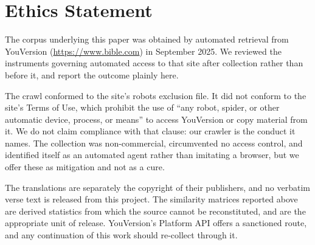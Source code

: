 \section{Ethics Statement}\label{sec:ethics_stmt}

The corpus underlying this paper was obtained by automated retrieval from
YouVersion (\url{https://www.bible.com}) in September 2025. We reviewed the
instruments governing automated access to that site after collection rather than
before it, and report the outcome plainly here.

The crawl conformed to the site's robots exclusion file. It did not conform to
the site's Terms of Use, which prohibit the use of ``any robot, spider, or other
automatic device, process, or means'' to access YouVersion or copy material from
it. We do not claim compliance with that clause: our crawler is the conduct it
names. The collection was non-commercial, circumvented no access control, and
identified itself as an automated agent rather than imitating a browser, but we
offer these as mitigation and not as a cure.

The translations are separately the copyright of their publishers, and no
verbatim verse text is released from this project. The similarity matrices
reported above are derived statistics from which the source cannot be
reconstituted, and are the appropriate unit of release. YouVersion's Platform API
offers a sanctioned route, and any continuation of this work should re-collect
through it.
